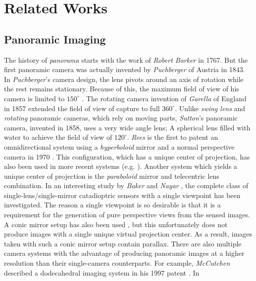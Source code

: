 
\section{Related Works}

\subsection{Panoramic Imaging}
The history of \emph{panorama} starts with the work of \emph{Robert Barker} in 1767. But the first
panoramic camera was actually invented by \emph{Puchberger} of Austria in 1843. In
\emph{Puchberger}'s camera design, the lens pivots around an axis of rotation while the rest
remains stationary. Because of this, the maximum field of view of his camera is limited to
$150^\circ$ \cite{ben01-2}. The rotating camera invention of \emph{Garella} of England in 1857
extended the field of view of capture to full $360^\circ$. Unlike \emph{swing lens} and
\emph{rotating} panoramic cameras, which rely on moving parts, \emph{Sutton}'s panoramic camera,
invented in 1858, uses a very wide angle lens; A spherical lens filled with water to achieve the
field of view of $120^\circ$. \emph{Rees} is the first to patent an omnidirectional system using a
\emph{hyperboloid} mirror and a normal perspective camera in 1970 \cite{ree70}. This configuration,
which has a unique center of projection, has also been used in more recent systems (e.g.
\cite{svo98,yam93}). Another system which yields a unique center of projection is the
\emph{paraboloid} mirror and telecentric lens combination. In an interesting study by \emph{Baker}
and \emph{Nayar} \cite{bak99}, the complete class of single-lens/single-mirror catadioptric sensors
with a single viewpoint has been investigated. The reason a single viewpoint is so desirable is
that it is a requirement for the generation of pure perspective views from the sensed images. A
conic mirror setup has also been used \cite{yag94}, but this unfortunately does not produce images
with a single unique virtual projection center. As a result, images taken with such a conic mirror
setup contain parallax. There are also multiple camera systems with the advantage of producing
panoramic images at a higher resolution than their single-camera counterparts. For example,
\emph{McCutchen} described a dodecahedral imaging system in his 1997 patent \cite{mcc97}. In
